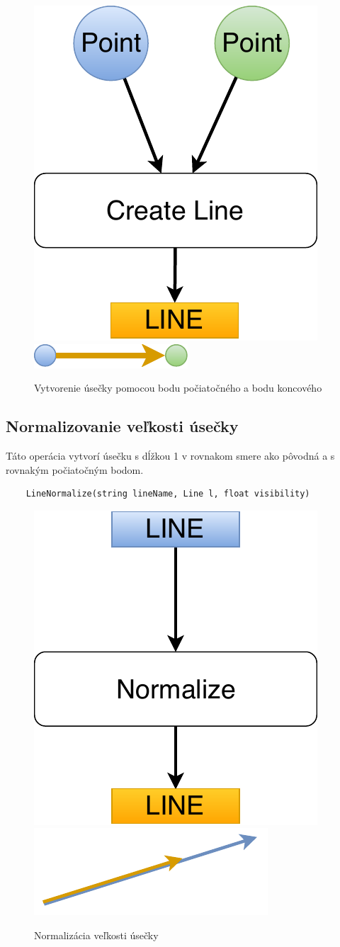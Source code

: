 \begin{figure}[H]
	\centering
	\includegraphics[height=0.3\textwidth]{obrazky-figures/Diagram/Line/DP Navrh operacii-1D - Line.pdf}
	\includegraphics[]{obrazky-figures/Diagram/Draw/2Line/DP Navrh operacii-1D - Line.pdf}
	\caption{Vytvorenie úsečky pomocou bodu počiatočného a bodu koncového}
	\label{fig:1}
\end{figure}

\subsection{Normalizovanie veľkosti úsečky}
Táto operácia vytvorí úsečku s dĺžkou 1 v rovnakom smere ako pôvodná a s rovnakým počiatočným bodom.
\begin{lstlisting}
	LineNormalize(string lineName, Line l, float visibility)
\end{lstlisting}

\begin{figure}[H]
	\centering
	\includegraphics[height=0.3\textwidth]{obrazky-figures/Diagram/Line/DP Navrh operacii-1D - LineNormalize.pdf}
	\includegraphics[]{obrazky-figures/Diagram/Draw/2Line/DP Navrh operacii-1D - LineNormalize.pdf}
	\caption{Normalizácia veľkosti úsečky}
	\label{fig:1}
\end{figure}

